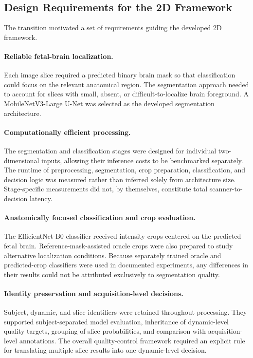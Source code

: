 \subsection{Design Requirements for the 2D Framework}
\label{subsec:2d_design_requirements}

The transition motivated a set of requirements guiding the developed 2D framework.

\paragraph{Reliable fetal-brain localization.}
Each image slice required a predicted binary brain mask so that classification could focus on the relevant anatomical region. The segmentation approach needed to account for slices with small, absent, or difficult-to-localize brain foreground. A MobileNetV3-Large U-Net was selected as the developed segmentation architecture.

\paragraph{Computationally efficient processing.}
The segmentation and classification stages were designed for individual two-dimensional inputs, allowing their inference costs to be benchmarked separately. The runtime of preprocessing, segmentation, crop preparation, classification, and decision logic was measured rather than inferred solely from architecture size. Stage-specific measurements did not, by themselves, constitute total scanner-to-decision latency.

\paragraph{Anatomically focused classification and crop evaluation.}
The EfficientNet-B0 classifier received intensity crops centered on the predicted fetal brain. Reference-mask-assisted oracle crops were also prepared to study alternative localization conditions. Because separately trained oracle and predicted-crop classifiers were used in documented experiments, any differences in their results could not be attributed exclusively to segmentation quality.

\paragraph{Identity preservation and acquisition-level decisions.}
Subject, dynamic, and slice identifiers were retained throughout processing. They supported subject-separated model evaluation, inheritance of dynamic-level quality targets, grouping of slice probabilities, and comparison with acquisition-level annotations. The overall quality-control framework required an explicit rule for translating multiple slice results into one dynamic-level decision.

